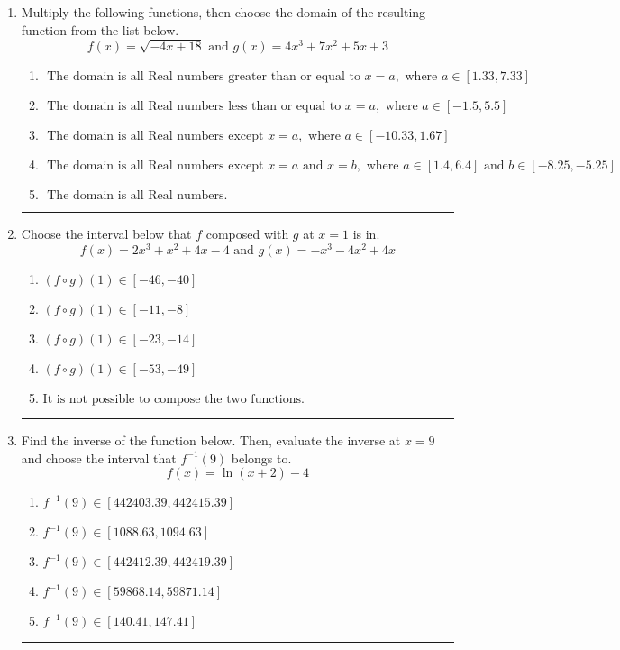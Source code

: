 \documentclass[14pt]{extbook}
\newcommand{\litem}[1]{\item#1\hspace*{-1cm}\rule{\textwidth}{0.4pt}}
\begin{document}
\begin{enumerate}
{\begin{enumerate}[label=\Alph*.]
\end{enumerate} }
\litem{
Multiply the following functions, then choose the domain of the resulting function from the list below.\[ f(x) = \sqrt{-4x+18}  \text{ and } g(x) = 4x^{3} +7 x^{2} +5 x + 3 \]\begin{enumerate}[label=\Alph*.]
\item \( \text{ The domain is all Real numbers greater than or equal to } x = a, \text{ where } a \in [1.33, 7.33] \)
\item \( \text{ The domain is all Real numbers less than or equal to } x = a, \text{ where } a \in [-1.5, 5.5] \)
\item \( \text{ The domain is all Real numbers except } x = a, \text{ where } a \in [-10.33, 1.67] \)
\item \( \text{ The domain is all Real numbers except } x = a \text{ and } x = b, \text{ where } a \in [1.4, 6.4] \text{ and } b \in [-8.25, -5.25] \)
\item \( \text{ The domain is all Real numbers. } \)

\end{enumerate} }
\litem{
Choose the interval below that $f$ composed with $g$ at $x=1$ is in.\[ f(x) = 2x^{3} + x^{2} +4 x -4 \text{ and } g(x) = -x^{3} -4 x^{2} +4 x \]\begin{enumerate}[label=\Alph*.]
\item \( (f \circ g)(1) \in [-46, -40] \)
\item \( (f \circ g)(1) \in [-11, -8] \)
\item \( (f \circ g)(1) \in [-23, -14] \)
\item \( (f \circ g)(1) \in [-53, -49] \)
\item \( \text{It is not possible to compose the two functions.} \)

\end{enumerate} }
\litem{
Find the inverse of the function below. Then, evaluate the inverse at $x = 9$ and choose the interval that $f^{-1}(9)$ belongs to.\[ f(x) = \ln{(x+2)}-4 \]\begin{enumerate}[label=\Alph*.]
\item \( f^{-1}(9) \in [442403.39, 442415.39] \)
\item \( f^{-1}(9) \in [1088.63, 1094.63] \)
\item \( f^{-1}(9) \in [442412.39, 442419.39] \)
\item \( f^{-1}(9) \in [59868.14, 59871.14] \)
\item \( f^{-1}(9) \in [140.41, 147.41] \)

\end{enumerate} }
\end{enumerate}
\end{document}
